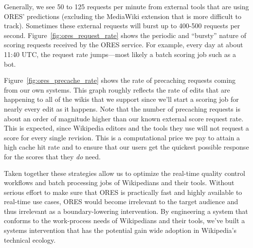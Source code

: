 Generally, we see 50 to 125 requests per minute from external tools that are using ORES' predictions (excluding the MediaWiki extension that is more difficult to track).  Sometimes these external requests will burst up to 400-500 requests per second.  Figure~\ref{fig:ores_request_rate} shows the periodic and ``bursty'' nature of scoring requests received by the ORES service.  For example, every day at about 11:40 UTC, the request rate jumps---most likely a batch scoring job such as a bot.

Figure~\ref{fig:ores_precache_rate} shows the rate of precaching requests coming from our own systems.  This graph roughly reflects the rate of edits that are happening to all of the wikis that we support since we'll start a scoring job for nearly every edit as it happens.  Note that the number of precaching requests is about an order of magnitude higher than our known external score request rate.  This is expected, since Wikipedia editors and the tools they use will not request a score for every single revision.  This is a computational price we pay to attain a high cache hit rate and to ensure that our users get the quickest possible response for the scores that they \emph{do} need.

Taken together these strategies allow us to optimize the real-time quality control workflows and batch processing jobs of Wikipedians and their tools.  Without serious effort to make sure that ORES is practically fast and highly available to real-time use cases, ORES would become irrelevant to the target audience and thus irrelevant as a boundary-lowering intervention.  By engineering a system that conforms to the work-process needs of Wikipedians and their tools, we've built a systems intervention that has the potential gain wide adoption in Wikipedia's technical ecology.
